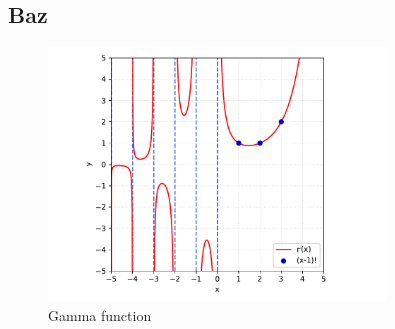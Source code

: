 
\subsection{Baz}

\begin{figure}[h]
	\centering
	\includegraphics[draft=false,width=0.80\textwidth]{./fig/gamma}
	\caption{Gamma function}
	\label{fig:gamma}
\end{figure}
